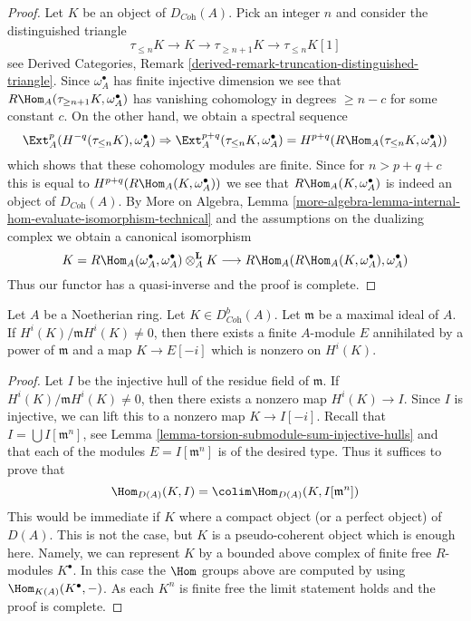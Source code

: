 \begin{proof}
Let $K$ be an object of $D_{\textit{Coh}}(A)$. Pick an integer $n$ and
consider the distinguished triangle
$$
\tau_{\leq n}K \to K \to \tau_{\geq n + 1}K \to \tau_{\leq n}K[1]
$$
see Derived Categories, Remark
\ref{derived-remark-truncation-distinguished-triangle}.
Since $\omega_A^\bullet$ has finite injective dimension we see
that $R\Hom_A(\tau_{\geq n + 1}K, \omega_A^\bullet)$ has vanishing
cohomology in degrees $\geq n - c$ for some constant $c$.
On the other hand, we obtain a spectral sequence
$$
\Ext_A^p(H^{-q}(\tau_{\leq n}K), \omega_A^\bullet)
\Rightarrow
\Ext_A^{p + q}(\tau_{\leq n}K, \omega_A^\bullet) =
H^{p + q}(R\Hom_A(\tau_{\leq n}K, \omega_A^\bullet))
$$
which shows that these cohomology modules are finite. Since for
$n > p + q + c$ this is equal to $H^{p + q}(R\Hom_A(K, \omega_A^\bullet))$
we see that $R\Hom_A(K, \omega_A^\bullet)$ is indeed an object
of $D_{\textit{Coh}}(A)$.
By More on Algebra, Lemma
\ref{more-algebra-lemma-internal-hom-evaluate-isomorphism-technical}
and the assumptions on the dualizing complex
we obtain a canonical isomorphism
$$
K = R\Hom_A(\omega_A^\bullet, \omega_A^\bullet) \otimes_A^\mathbf{L} K
\longrightarrow
R\Hom_A(R\Hom_A(K, \omega_A^\bullet), \omega_A^\bullet)
$$
Thus our functor has a quasi-inverse and the proof is complete.
\end{proof}

\begin{lemma}
\label{lemma-detect-cohomology}
Let $A$ be a Noetherian ring. Let $K \in D^b_{\textit{Coh}}(A)$.
Let $\mathfrak m$ be a maximal ideal of $A$.
If $H^i(K)/\mathfrak m H^i(K) \not = 0$, then there exists a finite
$A$-module $E$ annihilated by a power of $\mathfrak m$
and a map $K \to E[-i]$ which is nonzero on $H^i(K)$.
\end{lemma}

\begin{proof}
Let $I$ be the injective hull of the residue field of $\mathfrak m$.
If $H^i(K)/\mathfrak m H^i(K) \not = 0$, then there exists a nonzero
map $H^i(K) \to I$. Since $I$ is injective, we can lift this to a
nonzero map $K \to I[-i]$. Recall that $I = \bigcup I[\mathfrak m^n]$,
see Lemma \ref{lemma-torsion-submodule-sum-injective-hulls}
and that each of the modules $E = I[\mathfrak m^n]$ is of the
desired type. Thus it suffices to prove that
$$
\Hom_{D(A)}(K, I) = \colim \Hom_{D(A)}(K, I[\mathfrak m^n])
$$
This would be immediate if $K$ where a compact object
(or a perfect object) of $D(A)$. This is not the case, but
$K$ is a pseudo-coherent object which is enough here. Namely,
we can represent $K$ by a bounded above complex of finite
free $R$-modules $K^\bullet$. In this case the $\Hom$ groups
above are computed by using $\Hom_{K(A)}(K^\bullet, -)$.
As each $K^n$ is finite free the limit statement holds and the
proof is complete.
\end{proof}

